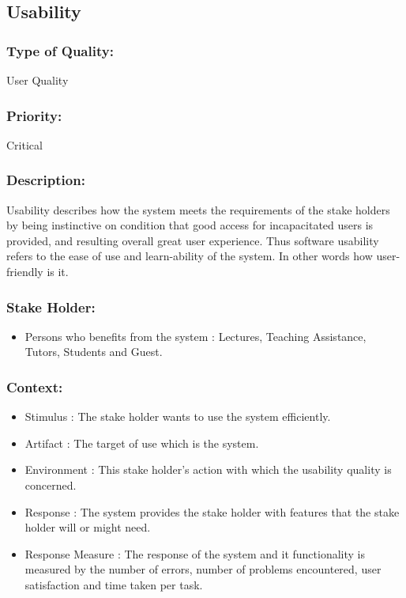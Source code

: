 \documentclass[11pt]{article}
\begin{document}
		
	\subsection{Usability }
		
		\subsubsection{Type of Quality:}
			\textbf{} User Quality
		
		\subsubsection{Priority:}
		\textbf{} Critical
		
		\subsubsection{Description:}
			\textbf{}Usability describes how the system meets the requirements of the stake holders by being instinctive on condition that good access for incapacitated users is provided, and resulting overall great user experience. Thus software usability refers to the ease of use and learn-ability of the system. In other words how user-friendly is it.  
		
		\subsubsection{Stake Holder:}
			\begin{itemize}
				\item Persons who benefits from the system : Lectures, Teaching Assistance, Tutors, Students and Guest.
			\end{itemize}
		\subsubsection{Context:}
			\begin{itemize}
				\item Stimulus : The stake holder wants to use the system efficiently.
				\item Artifact : The target of use which is the system.
				\item Environment : This stake holder’s action with which the usability quality is concerned.
				\item Response : The system provides the stake holder with features that the stake holder will or might need.
				\item Response Measure : The response of the system and it functionality is measured by the number of errors, number of problems encountered, user satisfaction and time taken per task.
			\end{itemize}
				
\end{document}
